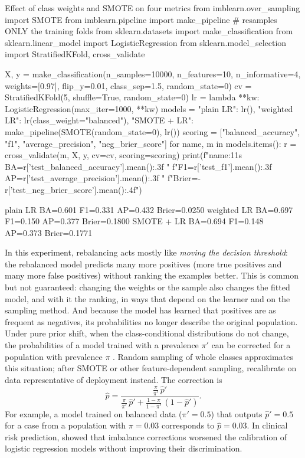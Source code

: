 \begin{pylisting}[label={lst:imbalance}]{Effect of class weights and SMOTE on four metrics}
from imblearn.over_sampling import SMOTE
from imblearn.pipeline import make_pipeline     # resamples ONLY the training folds
from sklearn.datasets import make_classification
from sklearn.linear_model import LogisticRegression
from sklearn.model_selection import StratifiedKFold, cross_validate

X, y = make_classification(n_samples=10000, n_features=10, n_informative=4,
                           weights=[0.97], flip_y=0.01, class_sep=1.5, random_state=0)
cv = StratifiedKFold(5, shuffle=True, random_state=0)
lr = lambda **kw: LogisticRegression(max_iter=1000, **kw)
models = {"plain LR": lr(),
          "weighted LR": lr(class_weight="balanced"),
          "SMOTE + LR": make_pipeline(SMOTE(random_state=0), lr())}
scoring = ["balanced_accuracy", "f1", "average_precision", "neg_brier_score"]
for name, m in models.items():
    r = cross_validate(m, X, y, cv=cv, scoring=scoring)
    print(f"{name:11s} BA={r['test_balanced_accuracy'].mean():.3f} "
          f"F1={r['test_f1'].mean():.3f} AP={r['test_average_precision'].mean():.3f} "
          f"Brier={-r['test_neg_brier_score'].mean():.4f}")
\end{pylisting}
\begin{pyoutput}
plain LR    BA=0.601 F1=0.331 AP=0.432 Brier=0.0250
weighted LR BA=0.697 F1=0.150 AP=0.377 Brier=0.1800
SMOTE + LR  BA=0.694 F1=0.148 AP=0.373 Brier=0.1771
\end{pyoutput}

In this experiment, rebalancing acts mostly like \emph{moving the decision threshold}: the
rebalanced model predicts many more positives (more true positives and many more false
positives) without ranking the examples better. This is common but not guaranteed: changing the
weights or the sample also changes the fitted model, and with it the ranking, in ways that depend
on the learner and on the sampling method. And because the model has learned that positives are as
frequent as negatives, its probabilities no longer describe the original population. Under pure
prior shift, when the class-conditional distributions do not change, the probabilities of a model
trained with a prevalence $\pi'$ can be corrected for a population with prevalence $\pi$ \citep{saerens2002adjusting,elkan2001foundations}. Random
sampling of whole classes approximates this situation; after SMOTE or other feature-dependent
sampling, recalibrate on data representative of deployment instead. The correction is
\begin{equation}\label{eq:priorshift}
  \hat p=\frac{\frac{\pi}{\pi'}\,\hat p'}{\frac{\pi}{\pi'}\,\hat p'+\frac{1-\pi}{1-\pi'}\,(1-\hat p')}.
\end{equation}
For example, a model trained on balanced data ($\pi'=0.5$) that outputs $\hat p'=0.5$ for a
case from a population with $\pi=0.03$ corresponds to $\hat p=0.03$. In clinical risk
prediction, \citet{vandengoorbergh2022harm} showed that imbalance corrections worsened the
calibration of logistic regression models without improving their discrimination.

